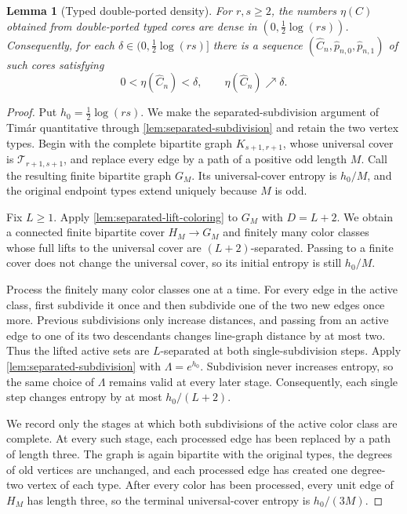 \documentclass[11pt]{amsart}
\theoremstyle{plain}
\newtheorem{lemma}[theorem]{Lemma}
\theoremstyle{definition}
\theoremstyle{remark}
\newcommand{\T}{\mathcal T}
\begin{document}
\begin{lemma}[Typed double-ported density]
\label{lem:ported-density}
For \(r,s\geq2\), the numbers \(\eta(C)\) obtained from double-ported typed
cores are dense in \((0,\frac12\log(rs))\).  Consequently, for each
\(\delta\in(0,\frac12\log(rs)]\) there is a sequence
\((\widehat C_n,\widehat p_{n,0},\widehat p_{n,1})\) of such cores satisfying
\begin{equation}\label{eq:ported-approximation}
  0<\eta(\widehat C_n)<\delta,
  \qquad
  \eta(\widehat C_n)\nearrow\delta.
\end{equation}
\end{lemma}

\begin{proof}
Put \(h_0=\frac12\log(rs)\).  We make
the separated-subdivision argument of Tim\'ar \cite{Timar2026} quantitative
through \cref{lem:separated-subdivision} and retain the two vertex types.
Begin with the complete bipartite graph \(K_{s+1,r+1}\), whose universal
cover is \(\T_{r+1,s+1}\), and replace every edge by a path of a positive odd
length \(M\).  Call the resulting finite bipartite graph \(G_M\).  Its
universal-cover entropy is \(h_0/M\), and the original endpoint types extend
uniquely because \(M\) is odd.

Fix \(L\geq1\).  Apply \cref{lem:separated-lift-coloring} to \(G_M\) with
\(D=L+2\).  We obtain a connected finite bipartite cover
\(H_M\to G_M\) and finitely many color classes whose full lifts to the
universal cover are \((L+2)\)-separated.  Passing to a finite cover does not
change the universal cover, so its initial entropy is still \(h_0/M\).

Process the finitely many color classes one at a time.  For every edge in the
active class, first subdivide it once and then subdivide one of the two new
edges once more.  Previous subdivisions only increase distances, and passing
from an active edge to one of its two descendants changes line-graph distance
by at most two.  Thus the lifted active sets are \(L\)-separated at both
single-subdivision steps.  Apply
\cref{lem:separated-subdivision} with \(\Lambda=e^{h_0}\).  Subdivision
never increases entropy, so the same choice of \(\Lambda\) remains valid at
every later stage.  Consequently, each single step changes entropy by at most
\(h_0/(L+2)\).

We record only the stages at which both subdivisions of the active color
class are complete.  At every such stage, each processed edge has
been replaced by a path of length three.  The graph is again bipartite with
the original types, the degrees of old vertices are unchanged, and each
processed edge has created one degree-two vertex of each type.  After every
color has been processed, every unit edge of \(H_M\) has length three, so the
terminal universal-cover entropy is \(h_0/(3M)\).


\end{proof}
\end{document}
